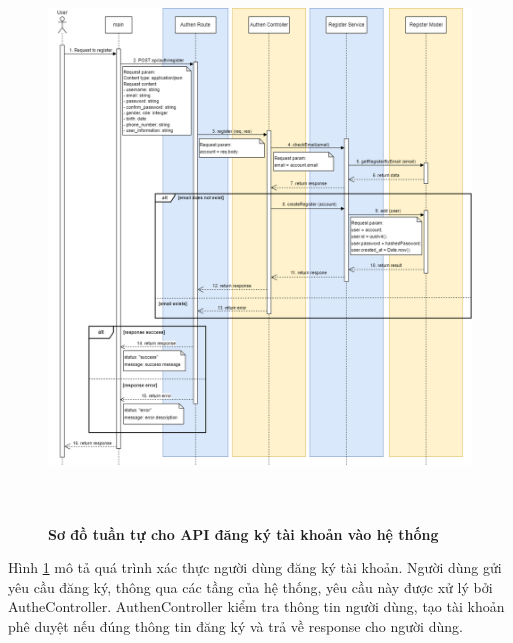 \begin{figure}[H]
  \centering
  \includegraphics[width=16cm,height=15cm]{Images/sequence_api/register.png}
  \caption[Sơ đồ tuần tự cho API đăng ký tài khoản vào hệ thống]{\bfseries \fontsize{12pt}{0pt}
  \selectfont Sơ đồ tuần tự cho API đăng ký tài khoản vào hệ thống }
  \label{api_register} %
\end{figure}
Hình \ref{api_register}  mô tả quá trình xác thực người dùng đăng ký tài khoản. Người dùng gửi yêu cầu đăng ký, thông qua các tầng của hệ thống, yêu cầu này được xử lý bởi AutheController. AuthenController kiểm tra thông tin người dùng, tạo tài khoản phê duyệt 
nếu đúng thông tin đăng ký và trả về response cho người dùng.

